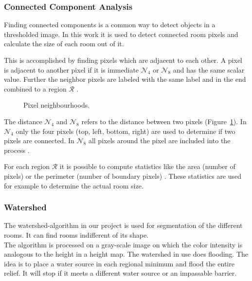 \subsubsection{Connected Component Analysis}
\label{sub:ConnectedComponentAnalysis}
Finding connected components is a common way to detect objects in a thresholded image. In this work it is used to detect connected room pixels and calculate the size of each room out of it.

This is accomplished by finding pixels which are adjacent to each other. A pixel is adjacent to another pixel if it is immediate $\mathcal{N}_4$ or $\mathcal{N}_8$ and has the same scalar value. Further the neighbor pixels are labeled with the same label and in the end combined to a region $\mathcal{R}$ \citep[Section 3.3.4]{szeliski_2011}.

\begin{figure}[h]
	\centering
	\hfill
	\caption{Pixel neighbourhoods.}
	\label{fig:pixel_neighbourhood}
\end{figure}

The distance $\mathcal{N}_4$ and $\mathcal{N}_8$ refers to the distance between two pixels (Figure~\ref{fig:pixel_neighbourhood}). In $\mathcal{N}_4$ only the four pixels (top, left, bottom, right) are used to determine if two pixels are connected. In $\mathcal{N}_8$ all pixels around the pixel are included into the process \citep{burger_burge_2016}.

For each region $\mathcal{R}$ it is possible to compute statistics like the area (number of pixels) or the perimeter (number of boundary pixels) \citep[Section 3.3.4]{szeliski_2011}. These statistics are used for example to determine the actual room size.

\subsubsection{Watershed}
\label{subsub:watershed}
The watershed-algorithm in our project is used for segmentation of the different rooms. It can find rooms indifferent of its shape.
\\
The algorithm is processed on a gray-scale image on which the color intensity is analogous to the height in a height map. The watershed in use does flooding. The idea is to place a water source in each regional minimum and flood the entire relief. It will stop if it meets a different water source or an impassable barrier.

